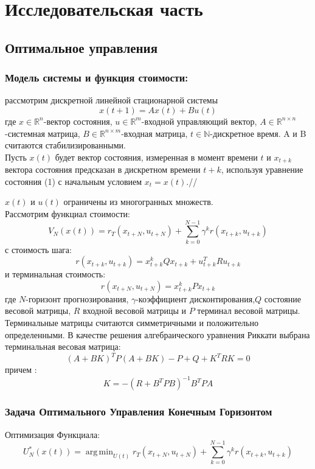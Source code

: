 \documentclass[a4paper,12pt]{article}
\DeclareMathOperator*{\argmin}{arg\,min}
\DeclareMathOperator*{\argmin}{arg\,min}
\begin{document}
\section{Исследовательская часть} 
\subsection{Оптимальное управления}
\subsubsection{Модель системы и функция стоимости:}
рассмотрим дискретной линейной стационарной системы
\begin{equation}
    x(t+1)=Ax(t)+Bu(t)
\end{equation}
где $x \in \mathbb{R}^n$-вектор состояния, $u \in \mathbb{R}^m$-входной управляющий вектор, $A \in \mathbb{R}^{n \times n}$-системная матрица, $B \in \mathbb{R}^{n \times m}$-входная матрица, $t \in \mathbb{N}$-дискретное время. A и B считаются стабилизированными.\\

Пусть $x(t)$ будет вектор состояния, измеренная в момент времени $t$ и $x_{t+k}$ вектора состояния предсказан в дискретном времени $t+k$, используя уравнение состояния (1) с начальным условием $x_t=x(t)$.//

$x(t)$ и $u(t)$ ограничены из многогранных множеств.\\

Рассмотрим функциал стоимости:
\begin{equation}
    V_N(x(t))=r_T(x_{t+N},u_{t+N})+\sum_{k=0}^{N-1} \gamma^k r(x_{t+k},u_{t+k})
\end{equation}
с стоимость шага:
$$r(x_{t+k},u_{t+k})=x_{t+k}^k Q x_{t+k} + u_{t+k}^T R u_{t+k}$$
и терминальная стоимость:
$$r(x_{t+N},u_{t+N})=x_{t+k}^k P x_{t+k}$$
где $N$-горизонт прогнозирования, $\gamma$-коэффициент дисконтирования,$Q$ состояние весовой матрицы, $R$ входной весовой матрицы и $P$ терминал весовой матрицы.\\

Терминальные матрицы считаются симметричными и положительно определенными.
В качестве решения алгебраического уравнения Риккати выбрана терминальная весовая матрица:
\begin{equation}
    (A+BK)^T P (A+BK)-P+Q+K^T R K=0
\end{equation}
причем :
$$K=-(R+B^T P B)^{-1} B^T P A$$
\subsubsection{Задача Оптимального Управления Конечным Горизонтом}
Оптимизация Функциала:
\begin{equation}
    U_{N}^*(x(t))=\argmin_{U(t)} r_T(x_{t+N},u_{t+N})+\sum_{k=0}^{N-1} \gamma^k r(x_{t+k},u_{t+k})
\end{equation}
\end{document}
